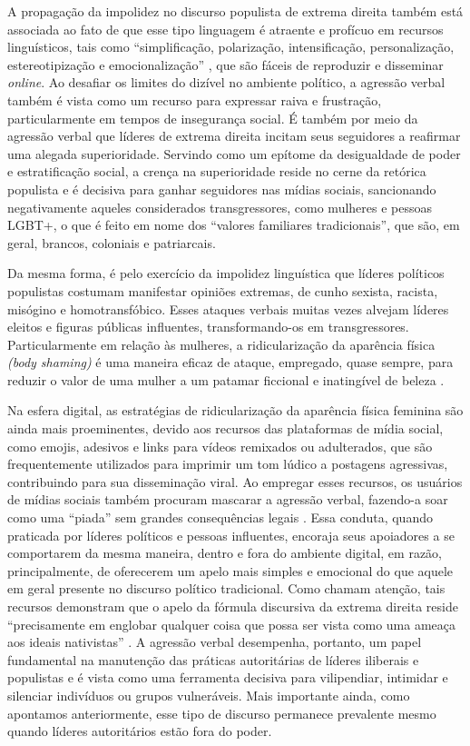 \documentclass[portuguese]{textolivre}
\begin{document}
A propagação da impolidez no discurso populista de extrema direita também está associada ao fato de que esse tipo linguagem é atraente e profícuo em recursos linguísticos, tais como ``simplificação, polarização, intensificação, personalização, estereotipização e emocionalização'' \cite{wodak2021culpeper}, que são fáceis de reproduzir e disseminar \textit{online}. Ao desafiar os limites do dizível no ambiente político, a agressão verbal também é vista como um recurso para expressar raiva e frustração, particularmente em tempos de insegurança social. É também por meio da agressão verbal que líderes de extrema direita incitam seus seguidores a reafirmar uma alegada superioridade. Servindo como um epítome da desigualdade de poder e estratificação social, a crença na superioridade reside no cerne da retórica populista e é decisiva para ganhar seguidores nas mídias sociais, sancionando negativamente aqueles considerados transgressores, como mulheres e pessoas LGBT+, o que é feito em nome dos ``valores familiares tradicionais'', que são, em geral, brancos, coloniais e patriarcais.

Da mesma forma, é pelo exercício da impolidez linguística que líderes políticos populistas costumam manifestar opiniões extremas, de cunho sexista, racista, misógino e homotransfóbico. Esses ataques verbais muitas vezes alvejam líderes eleitos e figuras públicas influentes, transformando-os em transgressores. Particularmente em relação às mulheres, a ridicularização da aparência física \textit{(body shaming)} é uma maneira eficaz de ataque, empregado, quase sempre, para reduzir o valor de uma mulher a um patamar ficcional e inatingível de beleza \cite{oliveira2025}.

Na esfera digital, as estratégias de ridicularização da aparência física feminina são ainda mais proeminentes, devido aos recursos das plataformas de mídia social, como emojis, adesivos e links para vídeos remixados ou adulterados, que são frequentemente utilizados para imprimir um tom lúdico a postagens agressivas, contribuindo para sua disseminação viral. Ao empregar esses recursos, os usuários de mídias sociais também procuram mascarar a agressão verbal, fazendo-a soar como uma ``piada'' sem grandes consequências legais \cite{oliveira2025}. Essa conduta, quando praticada por líderes políticos e pessoas influentes, encoraja seus apoiadores a se comportarem da mesma maneira, dentro e fora do ambiente digital, em razão, principalmente, de oferecerem um apelo mais simples e emocional do que aquele em geral presente no discurso político tradicional. Como \textcite{zottola2022} chamam atenção, tais recursos demonstram que o apelo da fórmula discursiva da extrema direita reside ``precisamente em englobar qualquer coisa que possa ser vista como uma ameaça aos ideais nativistas'' \cite[p. 264]{zottola2022}. A agressão verbal desempenha, portanto, um papel fundamental na manutenção das práticas autoritárias de líderes iliberais e populistas e é vista como uma ferramenta decisiva para vilipendiar, intimidar e silenciar indivíduos ou grupos vulneráveis. Mais importante ainda, como apontamos anteriormente, esse tipo de discurso permanece prevalente mesmo quando líderes autoritários estão fora do poder.
\end{document}
